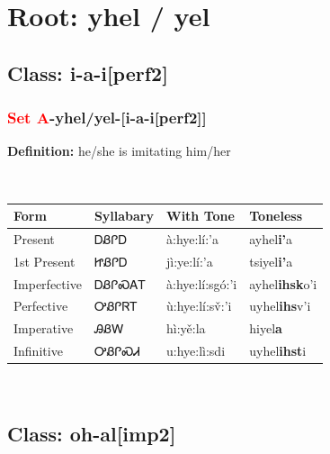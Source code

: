 \needspace{4in}
\section*{Root: yhel / yel}
\nopagebreak
{}
\needspace{3in}
\subsection*{Class: i-a-i[perf2]}
\nopagebreak
\needspace{2in}
\subsubsection*{\textcolor{Red}{Set A}{-}\textbf{yhel/yel}{-}[i-a-i[perf2]]}
\nopagebreak
\textbf{Definition: } he/she is imitating him/her
\\[0.5em]
\begin{tabularx}{\textwidth}{l X X X}%
\toprule%
\textbf{Form}&\textbf{Syllabary}&\textbf{With Tone}&\textbf{Toneless}\\%
\midrule%
Present&ᎠᏰᎵᎠ&à:hye:lí:’a&ayhel\textbf{i'}a\\%
1st Present&ᏥᏰᎵᎠ&jì:ye:lí:’a&tsiyel\textbf{i'}a\\%
Imperfective&ᎠᏰᎵᏍᎪᎢ&à:hye:lí:sgó:’i&ayhel\textbf{ihsk}o'i\\%
Perfective&ᎤᏰᎵᏒᎢ&ù:hye:lí:sv̌:’i&uyhel\textbf{ihs}v'i\\%
Imperative&ᎯᏰᎳ&hì:yě:la&hiyel\textbf{a}\\%
Infinitive&ᎤᏰᎵᏍᏗ&u:hye:lì:sdi&uyhel\textbf{ihst}i\\%
\bottomrule%
\end{tabularx}
\\[1em]
\needspace{3in}
\subsection*{Class: oh-al[imp2]}
\nopagebreak
\needspace{2in}
